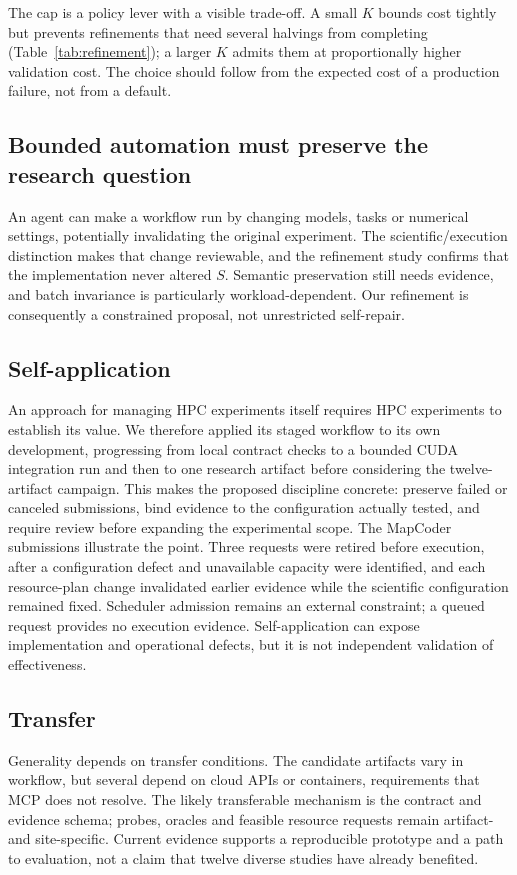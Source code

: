 The cap is a policy lever with a visible trade-off. A small $K$ bounds cost tightly but prevents refinements that need several halvings from completing (Table~\ref{tab:refinement}); a larger $K$ admits them at proportionally higher validation cost. The choice should follow from the expected cost of a production failure, not from a default.

\subsection{Bounded automation must preserve the research question}
An agent can make a workflow run by changing models, tasks or numerical settings, potentially invalidating the original experiment. The scientific/execution distinction makes that change reviewable, and the refinement study confirms that the implementation never altered $S$. Semantic preservation still needs evidence, and batch invariance is particularly workload-dependent. Our refinement is consequently a constrained proposal, not unrestricted self-repair.

\subsection{Self-application}
An approach for managing HPC experiments itself requires HPC experiments to establish its value. We therefore applied its staged workflow to its own development, progressing from local contract checks to a bounded CUDA integration run and then to one research artifact before considering the twelve-artifact campaign. This makes the proposed discipline concrete: preserve failed or canceled submissions, bind evidence to the configuration actually tested, and require review before expanding the experimental scope. The MapCoder submissions illustrate the point. Three requests were retired before execution, after a configuration defect and unavailable capacity were identified, and each resource-plan change invalidated earlier evidence while the scientific configuration remained fixed. Scheduler admission remains an external constraint; a queued request provides no execution evidence. Self-application can expose implementation and operational defects, but it is not independent validation of effectiveness.

\subsection{Transfer}
Generality depends on transfer conditions. The candidate artifacts vary in workflow, but several depend on cloud APIs or containers, requirements that MCP does not resolve. The likely transferable mechanism is the contract and evidence schema; probes, oracles and feasible resource requests remain artifact- and site-specific. Current evidence supports a reproducible prototype and a path to evaluation, not a claim that twelve diverse studies have already benefited.

